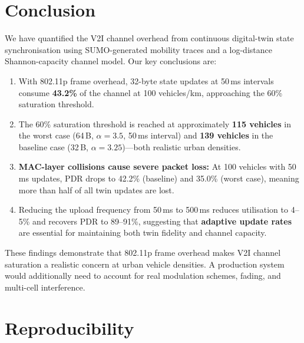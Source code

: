 \documentclass[12pt, a4paper]{article}
\begin{document}
\section{Conclusion}

We have quantified the V2I channel overhead from continuous digital-twin
state synchronisation using SUMO-generated mobility traces and a
log-distance Shannon-capacity channel model.  Our key conclusions are:

\begin{enumerate}
    \item With 802.11p frame overhead, 32-byte state updates at 50\,ms
    intervals consume \textbf{43.2\%} of the channel at 100 vehicles/km,
    approaching the 60\% saturation threshold.

    \item The 60\% saturation threshold is reached at approximately
    \textbf{115 vehicles} in the worst case (64\,B, $\alpha = 3.5$, 50\,ms
    interval) and \textbf{139 vehicles} in the baseline case (32\,B,
    $\alpha = 3.25$)---both realistic urban densities.

    \item \textbf{MAC-layer collisions cause severe packet loss:} At 100
    vehicles with 50\,ms updates, PDR drops to 42.2\% (baseline) and 35.0\%
    (worst case), meaning more than half of all twin updates are lost.

    \item Reducing the upload frequency from 50\,ms to 500\,ms reduces
    utilisation to 4--5\% and recovers PDR to 89--91\%, suggesting that
    \textbf{adaptive update rates} are essential for maintaining both twin
    fidelity and channel capacity.
\end{enumerate}

These findings demonstrate that 802.11p frame overhead makes V2I channel
saturation a realistic concern at urban vehicle densities.  A production system
would additionally need to account for real modulation schemes, fading, and
multi-cell interference.

\section{Reproducibility}
\end{document}

